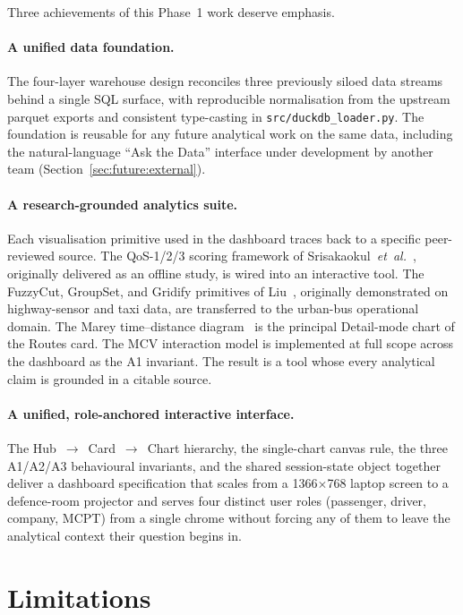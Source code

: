 Three achievements of this Phase~1 work deserve emphasis.

\paragraph{A unified data foundation.}
The four-layer warehouse design reconciles three previously
siloed data streams behind a single SQL surface, with
reproducible normalisation from the upstream parquet exports
and consistent type-casting in
\texttt{src/duckdb\_loader.py}. The foundation is reusable for
any future analytical work on the same data, including the
natural-language ``Ask the Data'' interface under development
by another team
(Section~\ref{sec:future:external}).

\paragraph{A research-grounded analytics suite.}
Each visualisation primitive used in the dashboard traces back
to a specific peer-reviewed source. The QoS-1/2/3 scoring
framework of Srisakaokul~\textit{et~al.}~\cite{srisakaokul2023},
originally delivered as an offline study, is wired into an
interactive tool. The FuzzyCut, GroupSet, and Gridify primitives
of Liu~\cite{liu2022}, originally demonstrated on highway-sensor
and taxi data, are transferred to the urban-bus operational
domain. The Marey time--distance
diagram~\cite{linzeng2014} is the principal Detail-mode chart
of the Routes card. The MCV interaction model is implemented at
full scope across the dashboard as the A1 invariant. The
result is a tool whose every analytical claim is grounded in a
citable source.

\paragraph{A unified, role-anchored interactive interface.}
The Hub~$\rightarrow$~Card~$\rightarrow$~Chart hierarchy, the
single-chart canvas rule, the three A1/A2/A3 behavioural
invariants, and the shared session-state object together
deliver a dashboard specification that scales from a
1366$\times$768 laptop screen to a defence-room projector and
serves four distinct user roles (passenger, driver, company,
MCPT) from a single chrome without forcing any of them to leave
the analytical context their question begins in.

\section{Limitations}
\label{sec:conclusion:limitations}

